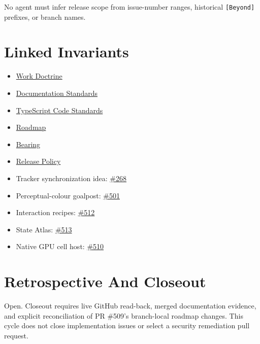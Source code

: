No agent must infer release scope from issue-number ranges, historical \texttt{[\allowbreak{}B\allowbreak{}e\allowbreak{}y\allowbreak{}o\allowbreak{}n\allowbreak{}d\allowbreak{}]} prefixes, or branch names.

\section{Linked Invariants}\label{record-249-linked-invariants}

\begin{itemize}
\tightlist
\item
  \href{https://github.com/flyingrobots/bijou/blob/5b10cb89165b76673ffc60da59d7de5a531e55e9/docs/METHOD.md}{Work Doctrine}
\item
  \href{https://github.com/flyingrobots/bijou/blob/cbd70612140e7a450d764b3c7be1c6af878b99bc/docs/DOCUMENTATION_STANDARDS.md}{Documentation Standards}
\item
  \href{https://github.com/flyingrobots/bijou/blob/cbd70612140e7a450d764b3c7be1c6af878b99bc/docs/typescript-code-standards.editors-edition.md}{TypeScript Code Standards}
\item
  \href{https://github.com/flyingrobots/bijou/blob/5b10cb89165b76673ffc60da59d7de5a531e55e9/docs/ROADMAP.md}{Roadmap}
\item
  \href{https://github.com/flyingrobots/bijou/blob/5b10cb89165b76673ffc60da59d7de5a531e55e9/docs/BEARING.md}{Bearing}
\item
  \href{https://github.com/flyingrobots/bijou/blob/1853ad902f6bf219326409e7f743a5a1d6517dbc/docs/method/releases/README.md}{Release Policy}
\item
  Tracker synchronization idea: \href{https://github.com/flyingrobots/bijou/issues/268}{\#268}
\item
  Perceptual-colour goalpost: \href{https://github.com/flyingrobots/bijou/issues/501}{\#501}
\item
  Interaction recipes: \href{https://github.com/flyingrobots/bijou/issues/512}{\#512}
\item
  State Atlas: \href{https://github.com/flyingrobots/bijou/issues/513}{\#513}
\item
  Native GPU cell host: \href{https://github.com/flyingrobots/bijou/issues/510}{\#510}
\end{itemize}

\section{Retrospective And Closeout}\label{record-249-retrospective-and-closeout}

Open. Closeout requires live GitHub read-back, merged documentation evidence, and explicit reconciliation of PR \#509's branch-local roadmap changes. This cycle does not close implementation issues or select a security remediation pull request.


